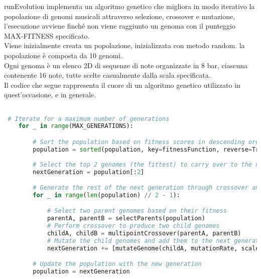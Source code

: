 \documentclass[a4paper,12pt]{report}
\begin{document}
runEvolution implementa un algoritmo genetico che migliora in modo iterativo la popolazione di genomi musicali attraverso selezione, crossover e mutazione, l'esecuzione avviene finché non viene raggiunto un genoma con il punteggio MAX-FITNESS specificato. \\
Viene inizialmente creata un popolazione, inizializzata con metodo random. la popolazione è composta da 10 genomi. \\
Ogni genoma è un elenco 2D di sequenze di note organizzate in 8 bar, ciascuna contenente 16 note, tutte scelte casualmente dalla scala specificata. \\
Il codice che segue rappresenta il cuore di un algoritmo genetico utilizzato in quest'occasione, e in generale.

\begin{lstlisting}[language=Python]

 # Iterate for a maximum number of generations
    for _ in range(MAX_GENERATIONS):

        # Sort the population based on fitness scores in descending order
        population = sorted(population, key=fitnessFunction, reverse=True)
        
        # Select the top 2 genomes (the fittest) to carry over to the next generation
        nextGeneration = population[:2]

        # Generate the rest of the next generation through crossover and mutation
        for _ in range(len(population) // 2 - 1):

            # Select two parent genomes based on their fitness
            parentA, parentB = selectParents(population)
            # Perform crossover to produce two child genomes
            childA, childB = multipointCrossover(parentA, parentB)
            # Mutate the child genomes and add them to the next generation
            nextGeneration += [mutateGenome(childA, mutationRate, scale), mutateGenome(childB, mutationRate, scale)]

        # Update the population with the new generation
        population = nextGeneration
        
\end{lstlisting}
\end{document}
